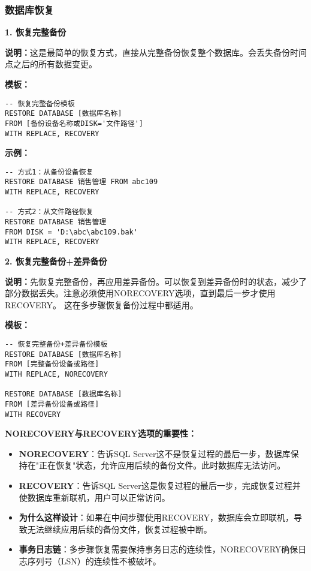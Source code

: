 \subsubsection{数据库恢复}

\textbf{1. 恢复完整备份}

\qquad \textbf{说明：}这是最简单的恢复方式，直接从完整备份恢复整个数据库。会丢失备份时间点之后的所有数据变更。

\qquad \textbf{模板：}
\begin{mdframed}[backgroundcolor=gray!10]
\begin{verbatim}
-- 恢复完整备份模板
RESTORE DATABASE [数据库名称]
FROM [备份设备名称或DISK='文件路径']
WITH REPLACE, RECOVERY
\end{verbatim}
\end{mdframed}

\qquad \textbf{示例：}
\begin{mdframed}[backgroundcolor=blue!5]
\begin{verbatim}
-- 方式1：从备份设备恢复
RESTORE DATABASE 销售管理 FROM abc109
WITH REPLACE, RECOVERY

-- 方式2：从文件路径恢复
RESTORE DATABASE 销售管理
FROM DISK = 'D:\abc\abc109.bak'
WITH REPLACE, RECOVERY
\end{verbatim}
\end{mdframed}

\textbf{2. 恢复完整备份+差异备份}

\qquad \textbf{说明：}先恢复完整备份，再应用差异备份。可以恢复到差异备份时的状态，减少了部分数据丢失。注意必须使用NORECOVERY选项，直到最后一步才使用RECOVERY。
这在多步骤恢复备份过程中都适用。

\qquad \textbf{模板：}
\begin{mdframed}[backgroundcolor=gray!10]
\begin{verbatim}
-- 恢复完整备份+差异备份模板
RESTORE DATABASE [数据库名称]
FROM [完整备份设备或路径]
WITH REPLACE, NORECOVERY

RESTORE DATABASE [数据库名称]
FROM [差异备份设备或路径]
WITH RECOVERY
\end{verbatim}
\end{mdframed}

\begin{mdframed}[backgroundcolor=yellow!20]
  \textbf{NORECOVERY与RECOVERY选项的重要性：}
  \begin{itemize}
    \item \textbf{NORECOVERY}：告诉SQL Server这不是恢复过程的最后一步，数据库保持在"正在恢复"状态，允许应用后续的备份文件。此时数据库无法访问。
    \item \textbf{RECOVERY}：告诉SQL Server这是恢复过程的最后一步，完成恢复过程并使数据库重新联机，用户可以正常访问。
    \item \textbf{为什么这样设计}：如果在中间步骤使用RECOVERY，数据库会立即联机，导致无法继续应用后续的备份文件，恢复过程被中断。
    \item \textbf{事务日志链}：多步骤恢复需要保持事务日志的连续性，NORECOVERY确保日志序列号（LSN）的连续性不被破坏。
  \end{itemize}
\end{mdframed}


